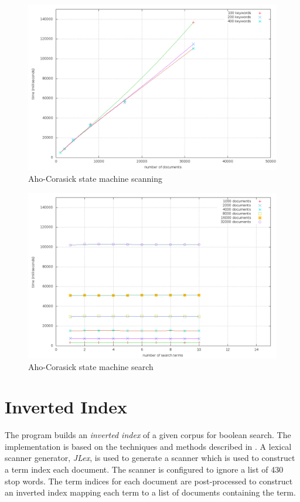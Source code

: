 \documentclass[10pt]{report}
\begin{document}
\begin{figure}
  \begin{center}
	\includegraphics[width=\textwidth,height=!]{ahoscan}
  \end{center}
  \caption{Aho-Corasick state machine scanning}
  \label{fig:ahoscan}
\end{figure} 

\begin{figure}
  \begin{center}
	\includegraphics[width=\textwidth,height=!]{ahosearch}
  \end{center}
  \caption{Aho-Corasick state machine search}
  \label{fig:ahosearch}
\end{figure} 

\section{Inverted Index}
The program builds an \textit{inverted index} of a given corpus for
boolean search. The implementation is based on the techniques and
methods described in \cite{RefWorks:109}. A lexical scanner generator,
\textit{JLex}\cite{RefWorks:112}, is used to generate a scanner which
is used to construct a term index each document. The scanner is
configured to ignore a list of 430 stop words. The term indices for
each document are post-processed to construct an inverted index
mapping each term to a list of documents containing the term.
\end{document}
